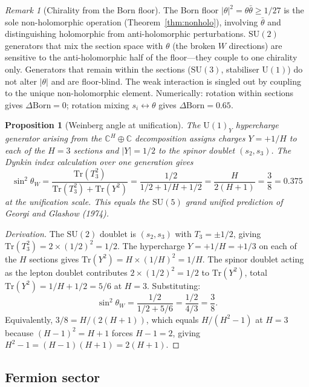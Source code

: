 \documentclass[11pt,a4paper]{article}
\newtheorem{proposition}[theorem]{Proposition}
\theoremstyle{definition}
\theoremstyle{remark}
\newtheorem{remark}[theorem]{Remark}
\newcommand{\C}{\mathbb{C}}
\newcommand{\SU}{\mathrm{SU}}
\begin{document}
\begin{remark}[Chirality from the Born floor]\label{rem:chirality}
The Born floor $|\theta|^2=\theta\bar\theta\geq 1/27$ is the sole non-holomorphic operation (Theorem~\ref{thm:nonholo}), involving $\bar\theta$ and distinguishing holomorphic from anti-holomorphic perturbations. $\SU(2)$ generators that mix the section space with $\theta$ (the broken $W$ directions) are sensitive to the anti-holomorphic half of the floor---they couple to one chirality only. Generators that remain within the sections ($\SU(3)$, stabiliser $\mathrm{U}(1)$) do not alter $|\theta|$ and are floor-blind. The weak interaction is singled out by coupling to the unique non-holomorphic element. Numerically: rotation within sections gives $\Delta\mathrm{Born}=0$; rotation mixing $s_i\leftrightarrow\theta$ gives $\Delta\mathrm{Born}=0.65$.
\end{remark}

\begin{proposition}[Weinberg angle at unification]\label{prop:weinberg}
The $\mathrm{U}(1)_Y$ hypercharge generator arising from the $\C^H\oplus\C$ decomposition assigns charges $Y=+1/H$ to each of the $H=3$ sections and $|Y|=1/2$ to the spinor doublet $(s_2,s_3)$. The Dynkin index calculation over one generation gives
\begin{equation}\label{eq:weinberg}
\sin^2\theta_W = \frac{\mathrm{Tr}(T_3^2)}{\mathrm{Tr}(T_3^2)+\mathrm{Tr}(Y^2)} = \frac{1/2}{1/2+1/H+1/2} = \frac{H}{2(H+1)} = \frac{3}{8} = 0.375
\end{equation}
at the unification scale. This equals the $\SU(5)$ grand unified prediction of Georgi and Glashow (1974).
\end{proposition}

\begin{proof}[Derivation]
The $\SU(2)$ doublet is $(s_2,s_3)$ with $T_3=\pm 1/2$, giving $\mathrm{Tr}(T_3^2)=2\times(1/2)^2=1/2$. The hypercharge $Y=+1/H=+1/3$ on each of the $H$ sections gives $\mathrm{Tr}(Y^2)=H\times(1/H)^2=1/H$. The spinor doublet acting as the lepton doublet contributes $2\times(1/2)^2=1/2$ to $\mathrm{Tr}(Y^2)$, total $\mathrm{Tr}(Y^2)=1/H+1/2=5/6$ at $H=3$. Substituting:
\[
\sin^2\theta_W = \frac{1/2}{1/2+5/6} = \frac{1/2}{4/3} = \frac{3}{8}.
\]
Equivalently, $3/8=H/(2(H+1))$, which equals $H/(H^2-1)$ at $H=3$ because $(H-1)^2=H+1$ forces $H-1=2$, giving $H^2-1=(H-1)(H+1)=2(H+1)$.
\end{proof}

\subsection{Fermion sector}\label{sec:fermion_sector}
\end{document}
